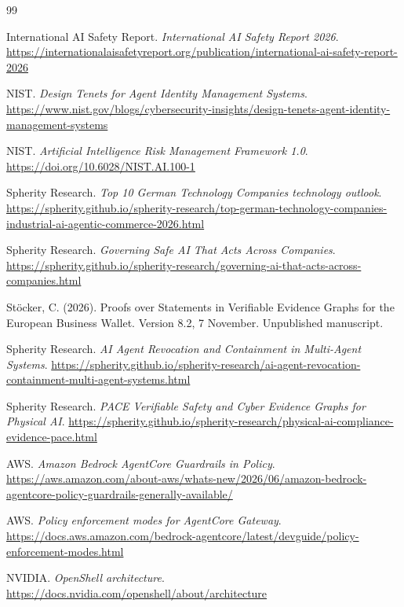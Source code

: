 \FloatBarrier
{}
{}
\begin{thebibliography}{99}

International AI Safety Report. \textit{International AI Safety Report 2026}.
\url{https://internationalaisafetyreport.org/publication/international-ai-safety-report-2026}

NIST. \textit{Design Tenets for Agent Identity Management Systems}.
\url{https://www.nist.gov/blogs/cybersecurity-insights/design-tenets-agent-identity-management-systems}

NIST. \textit{Artificial Intelligence Risk Management Framework 1.0}.
\url{https://doi.org/10.6028/NIST.AI.100-1}

Spherity Research. \textit{Top 10 German Technology Companies technology outlook}.
\url{https://spherity.github.io/spherity-research/top-german-technology-companies-industrial-ai-agentic-commerce-2026.html}

Spherity Research. \textit{Governing Safe AI That Acts Across Companies}.
\url{https://spherity.github.io/spherity-research/governing-ai-that-acts-across-companies.html}

Stöcker, C. (2026). Proofs over Statements in Verifiable Evidence Graphs for the European Business Wallet. Version 8.2, 7 November. Unpublished manuscript.

Spherity Research. \textit{AI Agent Revocation and Containment in Multi-Agent Systems}.
\url{https://spherity.github.io/spherity-research/ai-agent-revocation-containment-multi-agent-systems.html}

Spherity Research. \textit{PACE Verifiable Safety and Cyber Evidence Graphs for Physical AI}.
\url{https://spherity.github.io/spherity-research/physical-ai-compliance-evidence-pace.html}

AWS. \textit{Amazon Bedrock AgentCore Guardrails in Policy}.
\url{https://aws.amazon.com/about-aws/whats-new/2026/06/amazon-bedrock-agentcore-policy-guardrails-generally-available/}

AWS. \textit{Policy enforcement modes for AgentCore Gateway}.
\url{https://docs.aws.amazon.com/bedrock-agentcore/latest/devguide/policy-enforcement-modes.html}

NVIDIA. \textit{OpenShell architecture}.
\url{https://docs.nvidia.com/openshell/about/architecture}


\end{thebibliography}
